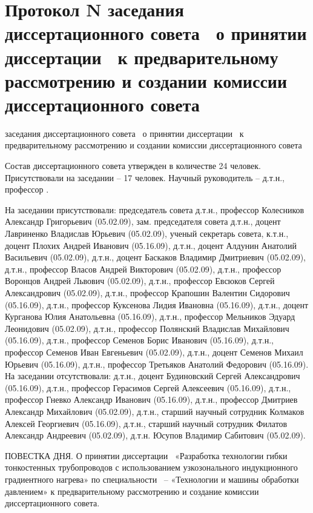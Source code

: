 
\section{Протокол N заседания диссертационного совета \ о принятии диссертации \thesisAuthorLastNameFromFull\ к предварительному рассмотрению и создании комиссии диссертационного совета}

заседания диссертационного совета \
о принятии диссертации \thesisAuthorLastNameFromFull\
к предварительному рассмотрению и создании комиссии диссертационного совета 

Состав диссертационного совета утвержден в количестве 24 человек. Присутствовали на заседании – 17 человек.
Научный руководитель – д.т.н., профессор \supervisorFioShort.

На заседании присутствовали: председатель совета д.т.н., профессор Колесников Александр Григорьевич (05.02.09), зам. председателя совета д.т.н., доцент Лавриненко Владислав Юрьевич (05.02.09), ученый секретарь совета, к.т.н., доцент Плохих Андрей Иванович (05.16.09), д.т.н., доцент Алдунин Анатолий Васильевич (05.02.09), д.т.н., доцент Баскаков Владимир Дмитриевич (05.02.09), д.т.н., профессор Власов Андрей Викторович (05.02.09), д.т.н., профессор Воронцов Андрей Львович (05.02.09), д.т.н., профессор Евсюков Сергей Александрович (05.02.09), д.т.н., профессор Крапошин Валентин Сидорович (05.16.09), д.т.н., профессор Куксенова Лидия Ивановна (05.16.09), д.т.н., доцент Курганова Юлия Анатольевна (05.16.09), д.т.н., профессор Мельников Эдуард Леонидович (05.02.09), д.т.н., профессор Полянский Владислав Михайлович (05.16.09), д.т.н., профессор Семенов Борис Иванович (05.16.09), д.т.н., профессор Семенов Иван Евгеньевич (05.02.09), д.т.н., доцент Семенов Михаил Юрьевич (05.16.09), д.т.н., профессор Третьяков Анатолий Федорович (05.16.09).
На заседании отсутствовали: д.т.н., доцент Будиновский Сергей Александрович (05.16.09), д.т.н., профессор Герасимов Сергей Алексеевич (05.16.09), д.т.н., профессор Гневко Александр Иванович (05.16.09), д.т.н., профессор Дмитриев Александр Михайлович (05.02.09), д.т.н., старший научный сотрудник Колмаков Алексей Георгиевич (05.16.09), д.т.н., старший научный сотрудник Филатов Александр Андреевич (05.02.09), д.т.н. Юсупов Владимир Сабитович (05.02.09).

ПОВЕСТКА ДНЯ.
О принятии диссертации \thesisAuthorLastNameFromFull\ «Разработка технологии гибки тонкостенных трубопроводов с использованием узкозонального индукционного градиентного нагрева» по специальности \thesisSpecialtyNumber\ – «Технологии и машины обработки давлением» к предварительному рассмотрению и создание комиссии диссертационного совета.

